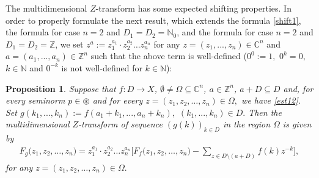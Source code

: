 \documentclass{amsart}
\newtheorem{prop}[thm]{Proposition}
\theoremstyle{definition}
\theoremstyle{remark}
\numberwithin{equation}{section}
\begin{document}
The multidimensional $Z$-transform has some expected shifting properties. In order to properly formulate the next result, which extends the formula \eqref{shift1}, the formula \cite[(2.173), p. 74]{jury} for case $n=2$ and $D_{1}=D_{2}={\mathbb N}_{0}$, and the formula \cite[(4.33b), p. 180]{dud} for case $n=2$ and $D_{1}=D_{2}={\mathbb Z}$, we set 
$z^{a}:=z_{1}^{a_{1}}\cdot z_{2} ^{a_{2}}\ldots z_{n}^{a_{n}}$ for any $z=(z_{1},...,z_{n})\in {\mathbb C}^{n}$ and $a=(a_{1},...,a_{n}) \in {\mathbb Z}^{n}$ such that the above term is well-defined ($0^{0}:=1,$ $0^{k}=0,$ $k\in {\mathbb N}$ and $0^{-k}$ is not well-defined for $k\in {\mathbb N}$):

\begin{prop}\label{manulakis}
Suppose that $f: D \rightarrow X$, $\emptyset \neq \Omega \subseteq {\mathbb C}^{n}$, $a\in {\mathbb Z}^{n}$, $a+D\subseteq D$ and, for every seminorm $p\in \circledast$ and for every $z=(z_{1},z_{2},\ldots ,z_{n})\in \Omega ,$ we have \eqref{est12}. Set $g(k_{1},...,k_{n}):=f(a_{1}+k_{1},...,a_{n}+k_{n}),$ $(k_{1},...,k_{n})\in D.$
Then the multidimensional $Z$-transform of sequence $(g(k))_{k\in D}$ in the region $\Omega$
is given by
\begin{align}\label{est121shift}
F_{g}\bigl(z_{1},z_{2},\ldots ,z_{n}\bigr)=z_{1}^{a_{1}}\cdot z_{2} ^{a_{2}}\ldots z_{n}^{a_{n}}\Biggl[ F_{f}\bigl(z_{1},z_{2},\ldots ,z_{n}\bigr)-\sum_{z\in D\setminus (a+D)}f(k)z^{-k}\Biggr],
\end{align}
for any $z=(z_{1},z_{2},\ldots ,z_{n})\in \Omega.$
\end{prop}
\end{document}
